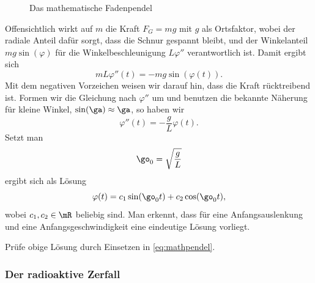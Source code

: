 \documentclass[%
11pt,%
twoside,%
titlepage,%
german,%
headsepline%
]{scrartcl}
\begin{document}
\begin{figure}
\begin{center}
\end{center}
\caption{Das mathematische Fadenpendel}
\end{figure}

Offensichtlich wirkt auf $m$ die Kraft $F_G=mg$ mit $g$ als Ortsfaktor, wobei der radiale Anteil daf\"ur sorgt, dass die Schnur gespannt bleibt, und der Winkelanteil $mg\sin(\varphi)$ f\"ur die Winkelbeschleunigung $L\varphi''$ verantwortlich ist. Damit ergibt sich
$$mL\varphi''(t)=-mg\sin(\varphi(t)).$$
Mit dem negativen Vorzeichen weisen wir darauf hin, dass die Kraft r\"ucktreibend ist. Formen wir die Gleichung nach $\varphi''$ um und benutzen die bekannte N\"aherung f\"ur kleine Winkel, $\sin(\ga)\approx\ga$, so haben wir
\begin{equation}\label{eq:mathpendel}
\varphi''(t)=-\frac{g}{L}\varphi(t).
\end{equation}
Setzt man
$$\go_0=\sqrt{\frac{g}{L}}$$
ergibt sich als L\"osung
$$\varphi(t)=c_1\sin(\go_0 t)+c_2\cos(\go_0 t),$$
wobei $c_1,c_2\in\mR$ beliebig sind.
Man erkennt, dass f\"ur eine Anfangsauslenkung und eine Anfangsgeschwindigkeit eine eindeutige L\"osung vorliegt.

\begin{ueb}
Pr\"ufe obige L\"osung durch Einsetzen in \eqref{eq:mathpendel}.
\end{ueb}

\subsubsection{Der radioaktive Zerfall}
\end{document}
